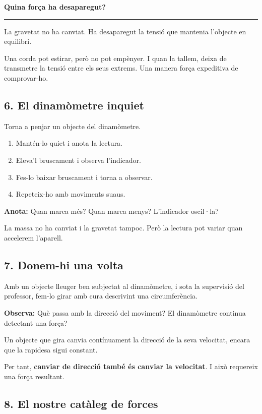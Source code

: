 \textbf{Quina força ha desaparegut?} \rule{2cm}{0.4pt}

La gravetat no ha canviat. Ha desaparegut la tensió que mantenia l'objecte en equilibri.

Una corda pot estirar, però no pot empènyer. I quan la tallem, deixa de transmetre la tensió entre els seus extrems. Una manera força expeditiva de comprovar-ho.

\subsection{6. El dinamòmetre inquiet}

Torna a penjar un objecte del dinamòmetre.

\begin{enumerate}
    \item Mantén-lo quiet i anota la lectura.
    \item Eleva'l bruscament i observa l'indicador.
    \item Fes-lo baixar bruscament i torna a observar.
    \item Repeteix-ho amb moviments suaus.
\end{enumerate}

\textbf{Anota:} Quan marca més? Quan marca menys? L'indicador oscil·la?

La massa no ha canviat i la gravetat tampoc. Però la lectura pot variar quan accelerem l'aparell.

\subsection{7. Donem-hi una volta}

Amb un objecte lleuger ben subjectat al dinamòmetre, i sota la supervisió del professor, fem-lo girar amb cura descrivint una circumferència.

\textbf{Observa:} Què passa amb la direcció del moviment? El dinamòmetre continua detectant una força?

Un objecte que gira canvia contínuament la direcció de la seva velocitat, encara que la rapidesa sigui constant.

Per tant, \textbf{canviar de direcció també és canviar la velocitat}. I això requereix una força resultant.

\subsection{8. El nostre catàleg de forces}

